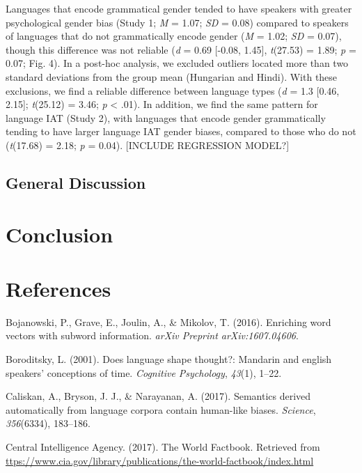 \documentclass[10pt, letterpaper]{article}
\begin{document}
Languages that encode grammatical gender tended to have speakers with
greater psychological gender bias (Study 1; \emph{M} = 1.07; \emph{SD} =
0.08) compared to speakers of languages that do not grammatically encode
gender (\emph{M} = 1.02; \emph{SD} = 0.07), though this difference was
not reliable (\emph{d} = 0.69 {[}-0.08, 1.45{]}, \emph{t}(27.53) = 1.89;
\emph{p} = 0.07; Fig. 4). In a post-hoc analysis, we excluded outliers
located more than two standard deviations from the group mean (Hungarian
and Hindi). With these exclusions, we find a reliable difference between
language types (\emph{d} = 1.3 {[}0.46, 2.15{]}; \emph{t}(25.12) = 3.46;
\emph{p} \textless{} .01). In addition, we find the same pattern for
language IAT (Study 2), with languages that encode gender grammatically
tending to have larger language IAT gender biases, compared to those who
do not (\emph{t}(17.68) = 2.18; \emph{p} = 0.04). {[}INCLUDE REGRESSION
MODEL?{]}

\subsection{General Discussion}\label{general-discussion}

\section{Conclusion}\label{conclusion}

\section{References}\label{references}

\setlength{\parindent}{-0.1in} \setlength{\leftskip}{0.125in} \noindent

\hypertarget{refs}{}
\hypertarget{ref-bojanowski2016enriching}{}
Bojanowski, P., Grave, E., Joulin, A., \& Mikolov, T. (2016). Enriching
word vectors with subword information. \emph{arXiv Preprint
arXiv:1607.04606}.

\hypertarget{ref-boroditsky2001does}{}
Boroditsky, L. (2001). Does language shape thought?: Mandarin and
english speakers' conceptions of time. \emph{Cognitive Psychology},
\emph{43}(1), 1--22.

\hypertarget{ref-caliskan2017semantics}{}
Caliskan, A., Bryson, J. J., \& Narayanan, A. (2017). Semantics derived
automatically from language corpora contain human-like biases.
\emph{Science}, \emph{356}(6334), 183--186.

\hypertarget{ref-ciafactbook}{}
Central Intelligence Agency. (2017). The World Factbook. Retrieved from
\url{ttps://www.cia.gov/library/publications/the-world-factbook/index.html}
\end{document}

